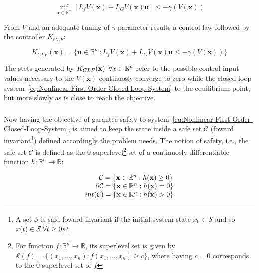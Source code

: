 \begin{equation}
 \inf_{\mathbf{u} \in \mathbb{R}^m} [L_fV(\mathbf{x}) + L_GV(\mathbf{x})\mathbf{u}] \leq -\gamma(V(\mathbf{x}))
 \label{eq:CLF}
\end{equation}

From  \(V\) and an adequate tuning of \( \gamma \) parameter results a control law followed by the controller \(K_{CLF}\):

\begin{equation}
 K_{CLF}(\mathbf{x}) = \{ \mathbf{u} \in \mathbb{R}^m: L_fV(\mathbf{x}) + L_GV(\mathbf{x})\mathbf{u} \leq -\gamma(V(\mathbf{x})) \}
 \label{eq:K-CLF}
\end{equation}

The stets generated by \(K_{CLF}(\mathbf{x}) \hspace{0.5em} \forall x \in \mathbb{R}^n \) refer to the possible control input values necessary to the  \(V(\mathbf{x})\) continuosly converge to zero while the closed-loop system~\ref{eq:Nonlinear-First-Order-Closed-Loop-System} to the equilibrium point, but more slowly as is close to reach the objective. \\


\subsubsection{}
\label{subsub:control_barrier_function}

Now having the objective of garantee safety to system~\ref{eq:Nonlinear-First-Order-Closed-Loop-System}, is aimed to keep the state inside a safe set \(\mathcal{C}\) (foward invariant\footnote{A set \(\mathcal{S}\) is said foward invariant if the initial system state \( x_0 \in \mathcal{S}\) and so \(x(t) \in \mathcal{S} \hspace{0.25em} \forall t \geq 0\) }) defined accordingly the problem needs. The notion of safety, i.e., the safe set \(\mathcal{C}\) is defined as the 0-superlevel\footnote{For function \(f: \mathbb{R}^n \to \mathbb{R}\), its superlevel set is given by \(\mathcal{S}(f) = \{(x_1,...,x_n): f(x_1,...,x_n) \geq c\}\), where having \(c = 0\) corresponds to the 0-superlevel set of \(f\)} set of a continuosly differentiable function \( h: \mathbb{R}^n \rightarrow \mathbb{R}  \):

\begin{equation}
    \begin{array}{l}
        \qquad   \mathcal{C} = \{ \mathbf{x} \in \mathbb{R}^n : h( \mathbf{x} )\geq 0\} \\
        \qquad \hspace{-0.5em}  \partial\mathcal{C} = \{ \mathbf{x} \in \mathbb{R}^n : h( \mathbf{x} ) = 0\} \\
        int(\mathcal{C}) = \{ \mathbf{x} \in \mathbb{R}^n : h( \mathbf{x} ) > 0\}
    \end{array}
 \label{eq:safe-set}
\end{equation}


